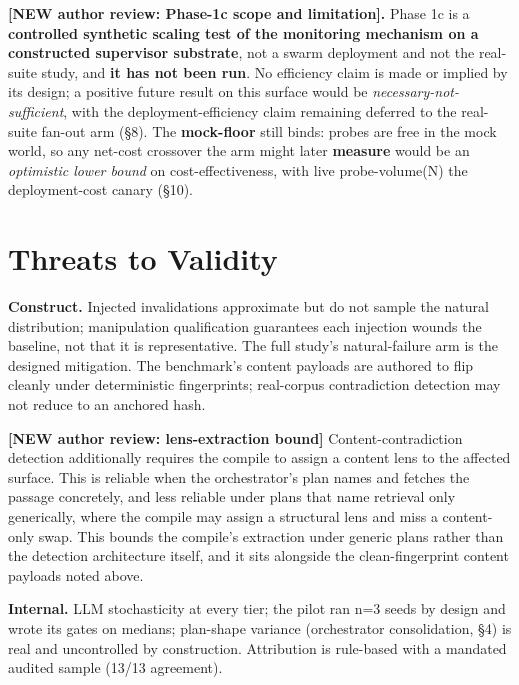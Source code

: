 \documentclass[acmsmall,screen,review,anonymous]{acmart}
\renewenvironment{leftbar}{%
  \def\FrameCommand{\hspace{2pt}{\color{lbcol}\vrule width 1.5pt}\hspace{8pt}}%
  \MakeFramed{\advance\hsize-\width \FrameRestore}\small}%
  {\endMakeFramed}
\begin{document}
\begin{leftbar}
\textbf{[NEW \textperiodcentered{} author review: Phase-1c scope and limitation].} Phase 1c is a \textbf{controlled synthetic scaling test of the monitoring mechanism on a constructed supervisor substrate}, not a swarm deployment and not the real-suite study, and \textbf{it has not been run}. No efficiency claim is made or implied by its design; a positive future result on this surface would be \emph{necessary-not-sufficient}, with the deployment-efficiency claim remaining deferred to the real-suite fan-out arm (\S8). The \textbf{mock-floor} still binds: probes are free in the mock world, so any net-cost crossover the arm might later \textbf{measure} would be an \emph{optimistic lower bound} on cost-effectiveness, with live probe-volume(N) the deployment-cost canary (\S10).

\end{leftbar}
\section{Threats to Validity}
\textbf{Construct.} Injected invalidations approximate but do not sample the natural distribution; manipulation qualification guarantees each injection wounds the baseline, not that it is representative. The full study's natural-failure arm is the designed mitigation. The benchmark's content payloads are authored to flip cleanly under deterministic fingerprints; real-corpus contradiction detection may not reduce to an anchored hash.

\begin{leftbar}
\textbf{[NEW \textperiodcentered{} author review: lens-extraction bound]} Content-contradiction detection additionally requires the compile to assign a content lens to the affected surface. This is reliable when the orchestrator's plan names and fetches the passage concretely, and less reliable under plans that name retrieval only generically, where the compile may assign a structural lens and miss a content-only swap. This bounds the compile's extraction under generic plans rather than the detection architecture itself, and it sits alongside the clean-fingerprint content payloads noted above.

\end{leftbar}
\textbf{Internal.} LLM stochasticity at every tier; the pilot ran n=3 seeds by design and wrote its gates on medians; plan-shape variance (orchestrator consolidation, \S4) is real and uncontrolled by construction. Attribution is rule-based with a mandated audited sample (13/13 agreement).
\end{document}
